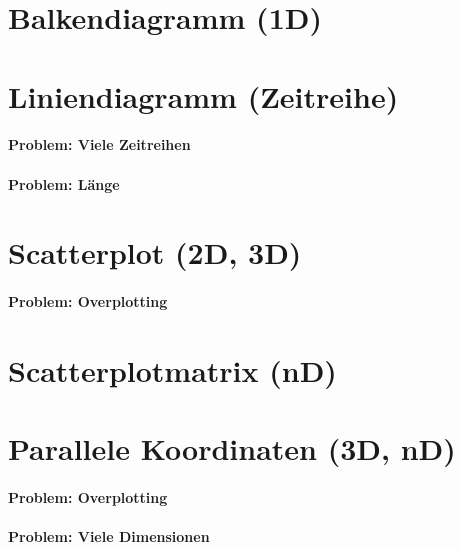 \documentclass[a4paper, 11pt, accentcolor = tud3b]{tudreport}
\begin{document}
		\section{Balkendiagramm (1D)} %

		\section{Liniendiagramm (Zeitreihe)} %

			\paragraph{Problem: Viele Zeitreihen} %

			\paragraph{Problem: Länge} %

		\section{Scatterplot (2D, 3D)} %

			\paragraph{Problem: Overplotting} %

		\section{Scatterplotmatrix (nD)} %

		\section{Parallele Koordinaten (3D, nD)} %

			\paragraph{Problem: Overplotting} %

			\paragraph{Problem: Viele Dimensionen} %
\end{document}
